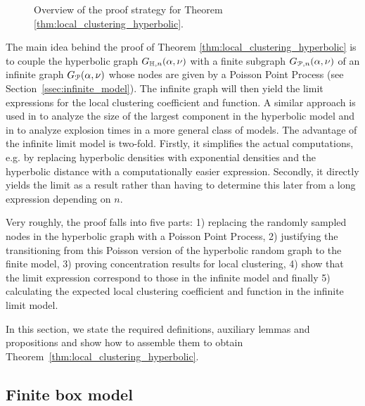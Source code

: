 \begin{figure}[!t]

\caption{Overview of the proof strategy for Theorem \ref{thm:local_clustering_hyperbolic}.}
\label{fig:overview_proof}
\end{figure}

The main idea behind the proof of Theorem \ref{thm:local_clustering_hyperbolic} is to couple the hyperbolic graph $G_{\mathbb{H}, n}(\alpha, \nu)$ with a finite subgraph $G_{{\mathcal P},n}(\alpha,\nu)$ of an infinite graph $G_{{\mathcal P}}(\alpha,\nu)$ whose nodes are given by a Poisson Point Process (see Section~\ref{ssec:infinite_model}). The infinite graph will then yield the limit expressions for the local clustering coefficient and function. A similar approach is used in \cite{fountoulakis2018law} to analyze the size of the largest component in the hyperbolic model and in \cite{komjathy2018explosion} to analyze explosion times in a more general class of models. 
The advantage of the infinite limit model is two-fold. Firstly, it simplifies the actual computations, e.g. by replacing hyperbolic densities with exponential densities and the hyperbolic distance with a computationally easier expression. Secondly, it directly yields the limit as a result rather than having to determine this later from a long expression depending on $n$. 

Very roughly, the proof falls into five parts: 1) replacing the randomly sampled nodes in the hyperbolic graph with a Poisson Point Process, 2) justifying the transitioning from this Poisson version of the hyperbolic random graph to the finite model, 3) proving concentration results for local clustering, 4) show that the limit expression correspond to those in the infinite model and finally 5) calculating the expected local clustering coefficient and function in the infinite limit model.
	
In this section, we state the required definitions, auxiliary lemmas and propositions and show how to assemble them to obtain Theorem~\ref{thm:local_clustering_hyperbolic}.

\subsection{Finite box model}\label{ssec:finite_model}

